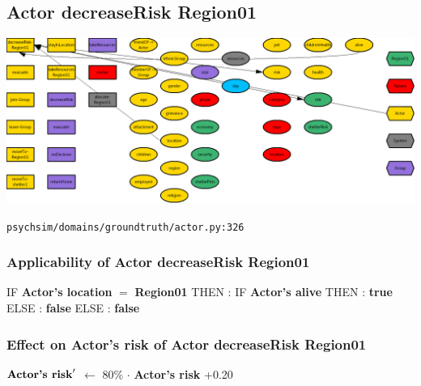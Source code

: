 \documentclass{article}%
\begin{document}
%
\subsection{Actor decreaseRisk Region01}%
\label{subsec:Actor decreaseRisk Region01}%
\includegraphics[width=\textwidth]{images/Actor-decreaseRisk-Region01.png}%
\begin{flushleft}%
\verb|psychsim/domains/groundtruth/actor.py:326|%
\end{flushleft}%
\subsubsection{Applicability of Actor decreaseRisk Region01}%
\label{ssubsec:Applicability of Actor decreaseRisk Region01}%
\begin{flushleft}%
IF %
\textbf{Actor's location}%
$=$%
\textbf{Region01}%
\linebreak%
\hspace*{2em}%
THEN %
: %
IF %
\textbf{Actor's alive}%
\linebreak%
\hspace*{4em}%
THEN %
: %
\textbf{true}%
\linebreak%
\hspace*{4em}%
ELSE %
: %
\textbf{false}%
\linebreak%
\hspace*{2em}%
ELSE %
: %
\textbf{false}%
\end{flushleft}

%
\subsubsection{Effect on Actor's risk of Actor decreaseRisk Region01}%
\label{ssubsec:Effect on Actor's risk of Actor decreaseRisk Region01}%
\begin{flushleft}%
$\mbox{\textbf{Actor's risk}} '$%
$\leftarrow$%
80\%%
$\cdot$%
\textbf{Actor's risk}%
+0.20%
\end{flushleft}
\end{document}
